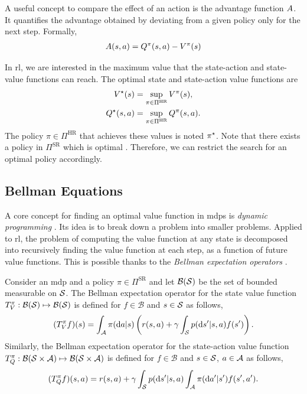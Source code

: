 A useful concept to compare the effect of an action is the advantage function $A$.
It quantifies the advantage obtained by deviating from a given policy only for the next step. 
Formally,
\begin{align}
\label{eq:advantage_function}
    A(s,a) = Q^\pi(s,a) - V^\pi(s)
\end{align}

In \gls{rl}, we are interested in the maximum value that the state-action and state-value functions can reach. 
The optimal state and state-action value functions are 
\begin{align*}
    V^{\star} (s)&= \sup_{\pi\in\Pi^{\text{HR}}}V^\pi(s),
    \\
    Q^{\star} (s,a)&= \sup_{\pi\in\Pi^{\text{HR}}}Q^\pi(s,a).
\end{align*}
The policy $\pi\in\Pi^{\text{HR}}$ that achieves these values is noted $\pi^\star$. 
Note that there exists a policy in $\Pi^{\text{SR}}$ which is optimal  \cite[Theorem~6.2.10]{puterman1994markov}. 
Therefore, we can restrict the search for an optimal policy accordingly. 

\subsection{Bellman Equations}
A core concept for finding an optimal value function in \glspl{mdp} is \emph{dynamic programming} \cite{bellman1954theory}. 
Its idea is to break down a problem into smaller problems.
Applied to \gls{rl}, the problem of computing the value function at any state is decomposed into recursively finding the value function at each step, as a function of future value functions. 
This is possible thanks to the \emph{Bellman expectation operators} \cite{bellman1966dynamic}.

\begin{defi}
    Consider an \gls{mdp} and a policy $\pi\in\Pi^{\text{SR}}$ and let $\mathcal{B}(\mathcal{S})$ be the set of bounded measurable on $\mathcal{S}$. 
    The Bellman expectation operator for the state value function $T^{\pi}_V:\mathcal{B}(\mathcal{S})\mapsto\mathcal{B}(\mathcal{S})$ is defined for $f\in\mathcal{B}$ and $s\in\mathcal{S}$ as follows,
    \begin{align}
    \label{eq:bellman_operator_V}
        (T^{\pi}_V f)(s) = \int_{\mathcal{A}}\pi(\mathrm{d} a\vert s)\left(r(s,a) + \gamma  \int_{\mathcal{S}}  p(\mathrm{d} s'\vert s,a) f(s')\right).
    \end{align}
    Similarly, the Bellman expectation operator for the state-action value function $T^{\pi}_Q:\mathcal{B}(\mathcal{S}\times\mathcal{A})\mapsto\mathcal{B}(\mathcal{S}\times\mathcal{A})$ is defined for $f\in\mathcal{B}$ and $s\in\mathcal{S}$, $a\in\mathcal{A}$ as follows,
    \begin{align}
    \label{eq:bellman_operator_Q}
        (T^{\pi}_Q f)(s,a) = r(s,a) + \gamma  \int_{\mathcal{S}}  p(\mathrm{d} s'\vert s,a)\int_{\mathcal{A}} \pi(\mathrm{d} a'\vert s')f(s',a').
    \end{align}
\end{defi} 

